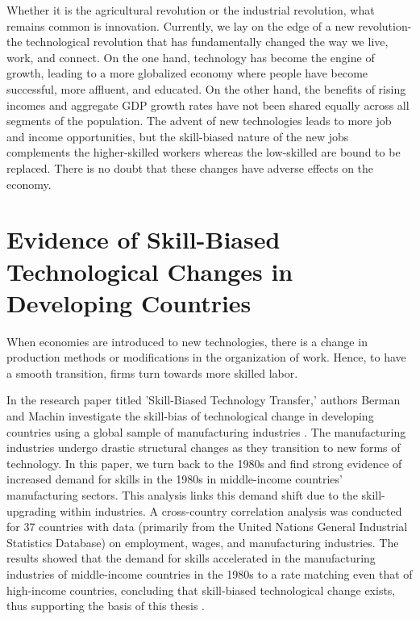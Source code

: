 Whether it is the agricultural revolution or the industrial revolution, what remains common is innovation. Currently, we lay on the edge of a new revolution- the technological revolution that has fundamentally changed the way we live, work, and connect. On the one hand, technology has become the engine of growth, leading to a more globalized economy where people have become successful, more affluent, and educated. On the other hand, the benefits of rising incomes and aggregate GDP growth rates have not been shared equally across all segments of the population.  The advent of new technologies leads to more job and income opportunities, but the skill-biased nature of the new jobs complements the higher-skilled workers whereas the low-skilled are bound to be replaced. There is no doubt that these changes have adverse effects on the economy.

\section{Evidence of Skill-Biased Technological Changes in Developing Countries}

\hspace{20pt}When economies are introduced to new technologies, there is a change in production methods or modifications in the organization of work. Hence, to have a smooth transition, firms turn towards more skilled labor.

\hspace{20pt}In the research paper titled 'Skill-Biased Technology Transfer,' authors Berman and Machin investigate the skill-bias of technological change in developing countries using a global sample of manufacturing industries \cite{berman2000skill}. The manufacturing industries undergo drastic structural changes as they transition to new forms of technology. In this paper, we turn back to the 1980s and find strong evidence of increased demand for skills in the 1980s in middle-income countries' manufacturing sectors. This analysis links this demand shift due to the skill-upgrading within industries. A cross-country correlation analysis was conducted for 37 countries with data (primarily from the United Nations General Industrial Statistics Database) on employment, wages, and manufacturing industries. The results showed that the demand for skills accelerated in the manufacturing industries of middle-income countries in the 1980s to a rate matching even that of high-income countries, concluding that skill-biased technological change exists, thus supporting the basis of this thesis \cite{berman2000skill}.


